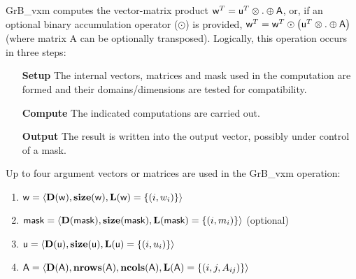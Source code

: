 {\sf GrB\_vxm} computes the vector-matrix product ${\sf w}^T = {\sf
u}^T \otimes . \oplus {\sf A}$, or, if an optional binary accumulation
operator ($\odot$) is provided, ${\sf w}^T = {\sf w}^T \odot
\left({\sf u}^T \otimes . \oplus {\sf A}\right)$ (where matrix {\sf A}
 can be optionally transposed).  Logically, this operation
occurs in three steps:
\begin{enumerate}[leftmargin=0.75in]
\item[\bf Setup] The internal vectors, matrices and mask used in the computation are formed and their domains/dimensions are tested for compatibility.
\item[\bf Compute] The indicated computations are carried out.
\item[\bf Output] The result is written into the output vector, possibly under control of a mask.
\end{enumerate}

Up to four argument vectors or matrices are used in the {\sf GrB\_vxm} operation:
\begin{enumerate}
	\item ${\sf w} = \langle \bold{D}({\sf w}),\bold{size}({\sf w}),\bold{L}({\sf w}) = \{(i,w_i) \} \rangle$
	\item ${\sf mask} = \langle \bold{D}({\sf mask}),\bold{size}({\sf mask}),\bold{L}({\sf mask}) = \{(i,m_i) \} \rangle$ (optional)
	\item ${\sf u} = \langle \bold{D}({\sf u}),\bold{size}({\sf u}),\bold{L}({\sf u}) = \{(i,u_i) \} \rangle$
	\item ${\sf A} = \langle \bold{D}({\sf A}),\bold{nrows}({\sf A}), \bold{ncols}({\sf A}),\bold{L}({\sf A}) = \{(i,j,A_{ij}) \} \rangle$
\end{enumerate}

